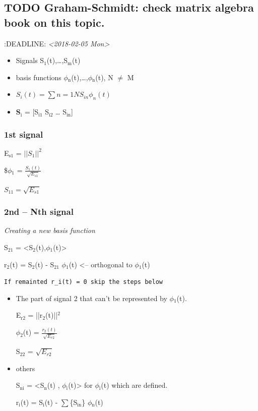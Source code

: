 \documentclass[11pt]{article}
\begin{document}
\subsection{{\bfseries\sffamily TODO} Graham-Schmidt: check matrix algebra book on this topic.}
\label{sec-5-3}
:DEADLINE: \textit{<2018-02-05 Mon>}

\begin{itemize}
\item Signals S$_{\text{1}}$(t),\ldots{},S$_{\text{m}}$(t)
\item basis functions $\phi$$_{\text{n}}$(t),\ldots{},$\phi$$_{\text{n}}$(t), N $\neq$ M
\item \(S_i(t) = \sum{n=1}{N}{S_{in} \phi_n(t)}\)
\item \textbf{S$_{\text{i}}$} = [S$_{\text{i1}}$ S$_{\text{i2}}$ \ldots{} S$_{\text{in}}$]
\end{itemize}

\subsubsection{1st signal}
\label{sec-5-3-1}

E$_{\text{s1}}$ = $||S_{1}||^2$

\$$\phi$$_{\text{1}}$ = $\frac{S_1(t)}{\sqrt{E_{s1}}}$

$S_{11} = \sqrt{E_{s1}}$

\subsubsection{2nd -- Nth signal}
\label{sec-5-3-2}
\emph{Creating a new basis function}

S$_{\text{21}}$ = <S$_{\text{2}}$(t),$\phi$$_{\text{1}}$(t)>



r$_{\text{2}}$(t) = S$_{\text{2}}$(t) - S$_{\text{21}}$ $\phi$$_{\text{1}}$(t) <-- orthogonal to $\phi$$_{\text{1}}$(t)

\texttt{If remainted r\_i(t) = 0 skip the steps below}

\begin{itemize}
\item The part of signal 2 that can't be represented by $\phi$$_{\text{1}}$(t).

E$_{\text{r2}}$ = ||r$_{\text{2}}$(t)||$^{\text{2}}$

$\phi$$_{\text{2}}$(t) = $\frac{r_2(t)}{\sqrt{E_{r2}}}$

S$_{\text{22}}$ = $\sqrt{E_{r2}}$
\item others

S$_{\text{ni}}$ = <S$_{\text{n}}$(t) , $\phi$$_{\text{i}}$(t)> for $\phi$$_{\text{i}}$(t) which are defined.

r$_{\text{i}}$(t) = S$_{\text{i}}$(t) - $\sum$\{S$_{\text{in}}$\} $\phi$$_{\text{n}}$(t)
\end{itemize}
\end{document}
